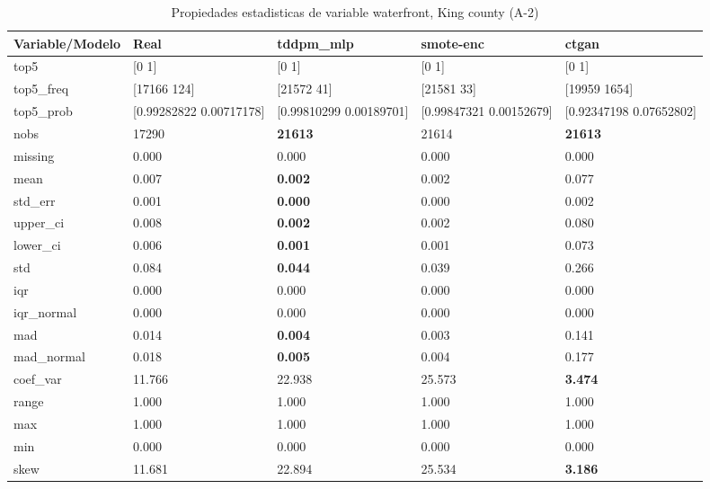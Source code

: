 \begin{table}[H]
\centering
\fontsize{8}{14}\selectfont
\caption{Propiedades  estadisticas de variable waterfront, King county (A-2)}
\label{table-stats-king county-a-2-waterfront}
\begin{tabular}{|l|m{10em}|m{10em}|m{10em}|m{10em}|}
\hline
 \rowcolor[gray]{0.8}
Variable/Modelo & Real & tddpm\_mlp & smote-enc & ctgan \\
\hline top5 & [0 1] & [0 1] & [0 1] & [0 1] \\
\hline top5\_freq & [17166   124] & [21572    41] & [21581    33] & [19959  1654] \\
\hline top5\_prob & [0.99282822 0.00717178] & [0.99810299 0.00189701] & [0.99847321 0.00152679] & [0.92347198 0.07652802] \\
\hline nobs & 17290 & \bfseries 21613 & \cellcolor[rgb]{0.9, 0.54, 0.52} 21614 & \bfseries 21613 \\
\hline missing & 0.000 & 0.000 & 0.000 & 0.000 \\
\hline mean & 0.007 & \bfseries 0.002 & 0.002 & \cellcolor[rgb]{0.9, 0.54, 0.52} 0.077 \\
\hline std\_err & 0.001 & \bfseries 0.000 & 0.000 & \cellcolor[rgb]{0.9, 0.54, 0.52} 0.002 \\
\hline upper\_ci & 0.008 & \bfseries 0.002 & 0.002 & \cellcolor[rgb]{0.9, 0.54, 0.52} 0.080 \\
\hline lower\_ci & 0.006 & \bfseries 0.001 & 0.001 & \cellcolor[rgb]{0.9, 0.54, 0.52} 0.073 \\
\hline std & 0.084 & \bfseries 0.044 & 0.039 & \cellcolor[rgb]{0.9, 0.54, 0.52} 0.266 \\
\hline iqr & 0.000 & 0.000 & 0.000 & 0.000 \\
\hline iqr\_normal & 0.000 & 0.000 & 0.000 & 0.000 \\
\hline mad & 0.014 & \bfseries 0.004 & 0.003 & \cellcolor[rgb]{0.9, 0.54, 0.52} 0.141 \\
\hline mad\_normal & 0.018 & \bfseries 0.005 & 0.004 & \cellcolor[rgb]{0.9, 0.54, 0.52} 0.177 \\
\hline coef\_var & 11.766 & 22.938 & \cellcolor[rgb]{0.9, 0.54, 0.52} 25.573 & \bfseries 3.474 \\
\hline range & 1.000 & 1.000 & 1.000 & 1.000 \\
\hline max & 1.000 & 1.000 & 1.000 & 1.000 \\
\hline min & 0.000 & 0.000 & 0.000 & 0.000 \\
\hline skew & 11.681 & 22.894 & \cellcolor[rgb]{0.9, 0.54, 0.52} 25.534 & \bfseries 3.186 \\

\end{tabular}
\end{table}
